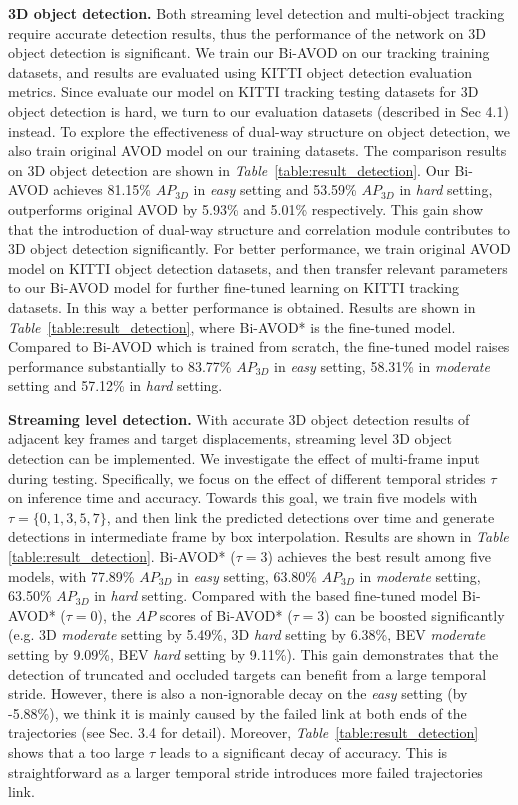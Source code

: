 \documentclass[letterpaper, 10 pt, conference]{ieeeconf}  %
\def\tablename{\emph{Table}}
\begin{document}
\textbf{3D object detection.} Both streaming level detection and multi-object tracking require accurate detection results, thus the performance of the network on 3D object detection is significant. We train our Bi-AVOD on our tracking training datasets, and results are evaluated using KITTI object detection evaluation metrics. Since evaluate our model on KITTI tracking testing datasets for 3D object detection is hard, we turn to our evaluation datasets (described in Sec 4.1) instead. To explore the effectiveness of dual-way structure on object detection, we also train original AVOD model on our training datasets. The comparison results on 3D object detection are shown in \tablename \, \ref{table:result_detection}. Our Bi-AVOD achieves 81.15\% $AP_{3D}$ in \textit{easy} setting and 53.59\% $AP_{3D}$ in \textit{hard} setting, outperforms original AVOD by 5.93\% and 5.01\% respectively. This gain show that the introduction of dual-way structure and correlation module contributes to 3D object detection significantly. For better performance, we train original AVOD model on KITTI object detection datasets, and then transfer relevant parameters to our Bi-AVOD model for further fine-tuned learning on KITTI tracking datasets. In this way a better performance is obtained. Results are shown in \tablename \, \ref{table:result_detection}, where Bi-AVOD* is the fine-tuned model. Compared to Bi-AVOD which is trained from scratch, the fine-tuned model raises performance substantially to 83.77\% $AP_{3D}$ in \textit{easy} setting, 58.31\% in \textit{moderate} setting and 57.12\% in \textit{hard} setting.

\textbf{Streaming level detection.} With accurate 3D object detection results of adjacent key frames and target displacements, streaming level 3D object detection can be implemented. We investigate the effect of multi-frame input during testing. Specifically, we focus on the effect of different temporal strides $\tau$  on inference time and accuracy. Towards this goal, we train five models with $\tau = \{0, 1, 3, 5, 7\}$, and then link the predicted detections over time and generate detections in intermediate frame by box interpolation. Results are shown in \tablename \, \ref{table:result_detection}. Bi-AVOD* ($\tau = 3$) achieves the best result among five models, with 77.89\% $AP_{3D}$ in \textit{easy} setting, 63.80\% $AP_{3D}$ in \textit{moderate} setting, 63.50\% $AP_{3D}$ in \textit{hard} setting. Compared with the based fine-tuned model Bi-AVOD* ($\tau = 0$), the $AP$ scores of Bi-AVOD* ($\tau = 3$) can be boosted significantly (e.g. 3D \textit{moderate} setting by 5.49\%, 3D \textit{hard} setting by 6.38\%, BEV \textit{moderate} setting by 9.09\%, BEV \textit{hard} setting by 9.11\%). This gain demonstrates that the detection of truncated and occluded targets can benefit from a large temporal stride. However, there is also a non-ignorable decay on the \textit{easy} setting (by -5.88\%), we think it is mainly caused by the failed link at both ends of the trajectories (see Sec. 3.4 for detail). Moreover,  \tablename \, \ref{table:result_detection} shows that a too large $\tau$ leads to a significant decay of accuracy. This is straightforward as a larger temporal stride introduces more failed trajectories link.
\end{document}
